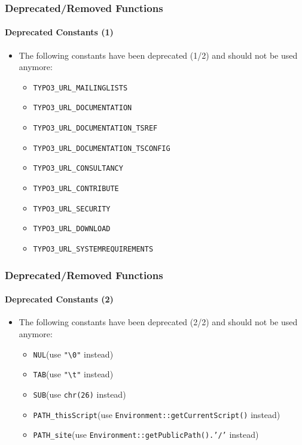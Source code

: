 \begin{frame}[fragile]
	\frametitle{Deprecated/Removed Functions}
	\framesubtitle{Deprecated Constants (1)}

	\begin{itemize}
		\item The following constants have been deprecated (1/2)\newline
			and should not be used anymore:

			\begin{itemize}\smaller
				\item \texttt{TYPO3\_URL\_MAILINGLISTS}
				\item \texttt{TYPO3\_URL\_DOCUMENTATION}
				\item \texttt{TYPO3\_URL\_DOCUMENTATION\_TSREF}
				\item \texttt{TYPO3\_URL\_DOCUMENTATION\_TSCONFIG}
				\item \texttt{TYPO3\_URL\_CONSULTANCY}
				\item \texttt{TYPO3\_URL\_CONTRIBUTE}
				\item \texttt{TYPO3\_URL\_SECURITY}
				\item \texttt{TYPO3\_URL\_DOWNLOAD}
				\item \texttt{TYPO3\_URL\_SYSTEMREQUIREMENTS}
			\end{itemize}

	\end{itemize}

\end{frame}


\begin{frame}[fragile]
	\frametitle{Deprecated/Removed Functions}
	\framesubtitle{Deprecated Constants (2)}

	\begin{itemize}
		\item The following constants have been deprecated (2/2)\newline
			and should not be used anymore:

			\begin{itemize}\smaller
				\item \texttt{NUL}\tabto{3cm}(use \texttt{"\textbackslash 0"} instead)
				\item \texttt{TAB}\tabto{3cm}(use \texttt{"\textbackslash t"} instead)
				\item \texttt{SUB}\tabto{3cm}(use \texttt{chr(26)} instead)
				\item \texttt{PATH\_thisScript}\tabto{3cm}(use \texttt{Environment::getCurrentScript()} instead)
				\item \texttt{PATH\_site}\tabto{3cm}(use \texttt{Environment::getPublicPath().'/'} instead)
			\end{itemize}
	\end{itemize}

\end{frame}

